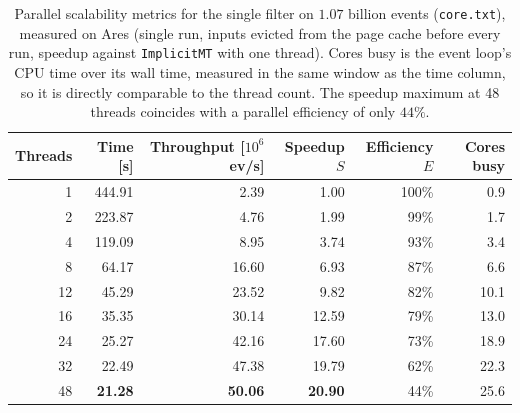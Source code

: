 \begin{table}[htbp]
\centering
\caption{Parallel scalability metrics for the single filter on $1.07$ billion events (\texttt{core.txt}), measured on Ares (single run, inputs evicted from the page cache before every run, speedup against \texttt{ImplicitMT} with one thread). Cores busy is the event loop's CPU time over its wall time, measured in the same window as the time column, so it is directly comparable to the thread count. The speedup maximum at 48 threads coincides with a parallel efficiency of only $44\%$.}
\label{tab:scalability-filter}
\begin{tabular}{rrrrrr}
\toprule
Threads & Time [s] & Throughput [$10^6$ ev/s] & Speedup $S$ & Efficiency $E$ & Cores busy \\
\midrule
 1 & 444.91 & 2.39 & 1.00 & 100\% & 0.9 \\
 2 & 223.87 & 4.76 & 1.99 & 99\% & 1.7 \\
 4 & 119.09 & 8.95 & 3.74 & 93\% & 3.4 \\
 8 & 64.17 & 16.60 & 6.93 & 87\% & 6.6 \\
12 & 45.29 & 23.52 & 9.82 & 82\% & 10.1 \\
16 & 35.35 & 30.14 & 12.59 & 79\% & 13.0 \\
24 & 25.27 & 42.16 & 17.60 & 73\% & 18.9 \\
32 & 22.49 & 47.38 & 19.79 & 62\% & 22.3 \\
48 & \textbf{21.28} & \textbf{50.06} & \textbf{20.90} & 44\% & 25.6 \\
\bottomrule
\end{tabular}
\end{table}
